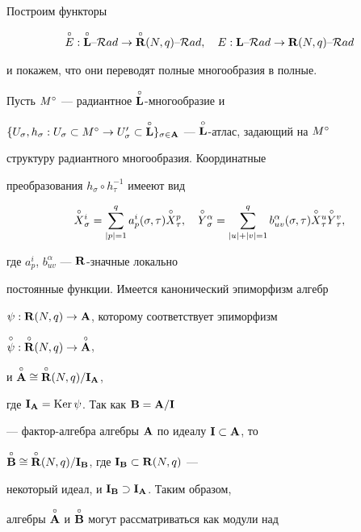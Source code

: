 \begin{pf}


Построим функторы


$$


\puto{E}: \Lo\text{--}{\cal R}ad


\to \puto{\R}(N,q)\text{--}{\cal R}ad, \quad


E:{\L}\text{--}{\cal R}ad


\to {\R}(N,q)\text{--}{\cal R}ad


$$


и покажем, что они переводят полные многообразия в полные.





Пусть ${M^\circ}$ --- радиантное $\overset{\circ}{\bold L}{}$-многообразие и


$\{U_\sigma, h_\sigma:U_\sigma\subset {\Mo} \to U_\sigma'\subset\Lo


\}_{\sigma\in\A}$ --- $\Lo$-атлас, задающий на ${\Mo}$


структуру радиантного многообразия. Координатные


преобразования $h_\sigma\circ h_\tau^{-1}$ имееют вид


\begin{equation} \label{a.3}


\overset{\circ}{X}{}^i_\sigma=\sum^q_{|p|=1}


a^i_p(\sigma,\tau)\Xopt,


\quad \overset{\circ}{Y}{}^\alpha_\sigma=\sum^q_{|u|+|v|=1}


b^\alpha_{uv}(\sigma,\tau)\Xout\Yovt,


\end{equation}


где $a^i_p$, $b^\alpha_{uv}$ --- ${\bold R}$-значные локально


постоянные функции. Имеется канонический эпиморфизм алгебр


$\psi: {\bold R}(N,q)\to {\bold A}$, которому соответствует эпиморфизм


$\overset{\circ}{\psi}{}: \overset{\circ}{{\bold R}}{}(N,q)\to \overset{\circ}{\bold A}{}$,


и $\overset{\circ}{\bold A}{}\cong\overset{\circ}{{\bold R}}{}(N,q)/{\bold I}_{\bold A}$,


где ${\bold I}_{\bold A}=\operatorname{Ker}\psi$. Так как ${\bold B}={\bold A}/{\bold I}$


--- фактор-алгебра алгебры ${\bold A}$ по идеалу ${\bold I}\subset{\bold A}$, то


$\overset{\circ}{\bold B}{}\cong\overset{\circ}{{\bold R}}{}(N,q)/{\bold I}_{\bold B}$, где ${\bold I}_{\bold B}\subset{{\bold R}}(N,q)$ ---


некоторый идеал, и ${\bold I}_{\bold B}\supset{\bold I}_{\bold A}$. Таким образом,


алгебры $\overset{\circ}{\bold A}{}$ и $\overset{\circ}{\bold B}{}$ могут рассматриваться как модули над



\end{pf}
